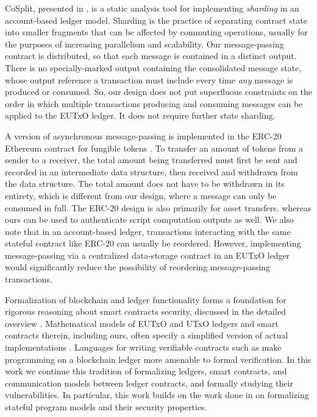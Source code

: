 CoSplit, presented in \cite{sharding}, is a static analysis tool for implementing
\emph{sharding} in an account-based ledger model. Sharding is the practice of
separating contract state into smaller
fragments that can be affected by commuting operations, usually for the purposes of
increasing parallelism and scalability. Our message-passing contract is
distributed, so that each message is contained in a distinct output.
There is no specially-marked output containing the
consolidated message state, whose output reference a transaction must
include every time \emph{any} message is produced or consumed.
So, our design does not put superfluous constraints on the order in which multiple
transactions producing and consuming
messages can be applied to the EUTxO ledger. It does not require further state sharding.

A version of asynchronous message-passing is implemented in the ERC-20 Ethereum contract for
fungible tokens \cite{ethereum-docs}. To transfer an amount of tokens from a sender to a receiver,
the total amount being transferred must first be sent and recorded in an intermediate
data structure, then received and withdrawn from the data structure. The total
amount does not have to be withdrawn in its entirety, which is different from
our design, where a message can only be consumed in full. The ERC-20 design is
also primarily for asset transfers, whereas ours can be used to authenticate
script computation outputs as well. We also note that in an
account-based ledger, transactions interacting with the same stateful
contract like ERC-20 can usually be reordered. However, implementing message-passing
via a centralized data-storage contract in an EUTxO ledger would significantly
reduce the possibility of reordering message-passing transactions.

Formalization of blockchain and ledger functionality forms a foundation for
rigorous reasoning about smart contracts security, discussed in the
detailed overview \cite{leveragingfm}. Mathematical models of
EUTxO and UTxO ledgers and smart contracts therein, including ours, often specify
a simplified version of actual implementations
\cite{eutxoma} \cite{blockalg} \cite{nester} \cite{algorandformal} \cite{bitcoinformal}.
Languages for writing verifiable contracts such as \cite{bitml} \cite{scilla}
make programming on a blockchain ledger more amenable to formal verification.
In this work we continue this tradition of formalizing ledgers, smart contracts, and communication
models between ledger contracts, and formally studying their vulnerabilities. In particular,
this work builds on the work
done in \cite{structured} \cite{eutxoma}
on formalizing stateful program models and their security properties.

